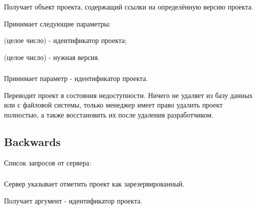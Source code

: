\subsubsection{}

Получает объект проекта, содержащий ссылки на определённую версию проекта.

Принимает следующие параметры:

\begin{icItems}
	\item {} (целое число) - идентификатор проекта;
	\item {} (целое число) - нужная версия.
\end{icItems}

\subsubsection{}

Принимает параметр  - идентификатор проекта.

Переводит проект в состояния недоступности. Ничего не удаляет из базу данных или с файловой системы, только менеджер имеет право удалить проект полностью, а также восстановить их после удаления разработчиком.

\subsection{Backwards}

Список запросов от сервера:
\begin{icItems}
	\item {}
	\item {}
	\item {}
	\item {}
	\item {}
\end{icItems}

\subsubsection{}

Сервер указывает отметить проект как зарезервированный.

Получает аргумент  - идентификатор проекта.

\subsubsection{}

